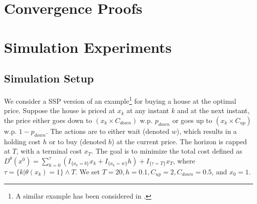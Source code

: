 \documentclass[11pt,letterpaper,english]{article}
\begin{document}
\section{Convergence Proofs}
\label{sec:convergence}

\section{Simulation Experiments}
\label{sec:expts}

\subsection{Simulation Setup}  
We consider a SSP version of an example\footnote{A similar example has been considered in \cite{chow2014algorithms}.} for buying a house at the optimal price. Suppose the house is priced at $x_k$ at any instant $k$ and at the next instant, the price either goes down to $\left(x_k \times C_{down}\right)$ w.p. $p_{down}$ or goes up to $\left(x_k\times C_{up}\right)$ w.p. $1-p_{down}$. The actions are to either wait (denoted $w$), which results in a holding cost $h$ or to buy (denoted $b$) at the current price. The horizon is capped at $T$, with a terminal cost $x_T$.  The goal is to minimize the total cost defined as $ 
D^{\theta}(x^0)= \sum_{k=0}^\tau \left(I_{\{a_k =b \} }x_k+I_{\{a_k =w \} } h\right) + I_{\{\tau=T\}} x_T$, where $\tau =  \{k | \theta(x_k)=1 \} \wedge T$.
We set $T=20, h=0.1, C_{up}=2, C_{down}=0.5$, and $x_0=1$.  
\end{document}
